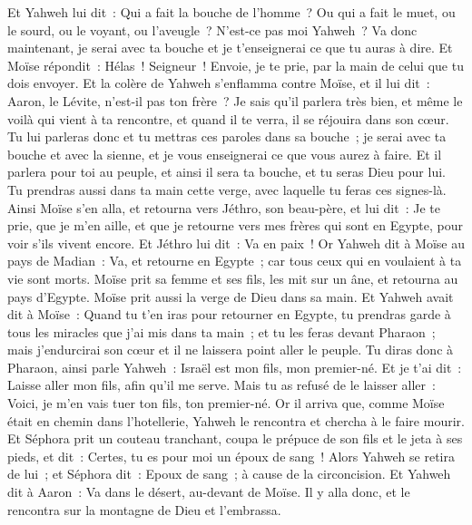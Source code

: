 \begin{multicols}{2}
Et Yahweh lui dit~: Qui a fait la bouche de l'homme~? Ou qui a fait le muet, ou le sourd, ou le voyant, ou l'aveugle~? N'est-ce pas moi Yahweh~?
Va donc maintenant, je serai avec ta bouche et je t'enseignerai ce que tu auras à dire.
Et Moïse répondit~: Hélas~! Seigneur~! Envoie, je te prie, par la main de celui que tu dois envoyer.
Et la colère de Yahweh s'enflamma contre Moïse, et il lui dit~: Aaron, le Lévite, n'est-il pas ton frère~? Je sais qu'il parlera très bien, et même le voilà qui vient à ta rencontre, et quand il te verra, il se réjouira dans son cœur.
Tu lui parleras donc et tu mettras ces paroles dans sa bouche~; je serai avec ta bouche et avec la sienne, et je vous enseignerai ce que vous aurez à faire.
Et il parlera pour toi au peuple, et ainsi il sera ta bouche, et tu seras Dieu pour lui.
Tu prendras aussi dans ta main cette verge, avec laquelle tu feras ces signes-là.
Ainsi Moïse s'en alla, et retourna vers Jéthro, son beau-père, et lui dit~: Je te prie, que je m'en aille, et que je retourne vers mes frères qui sont en Egypte, pour voir s'ils vivent encore. Et Jéthro lui dit~: Va en paix~!
Or Yahweh dit à Moïse au pays de Madian~: Va, et retourne en Egypte~; car tous ceux qui en voulaient à ta vie sont morts.
Moïse prit sa femme et ses fils, les mit sur un âne, et retourna au pays d'Egypte. Moïse prit aussi la verge de Dieu dans sa main.
Et Yahweh avait dit à Moïse~: Quand tu t'en iras pour retourner en Egypte, tu prendras garde à tous les miracles que j'ai mis dans ta main~; et tu les feras devant Pharaon~; mais j'endurcirai son cœur et il ne laissera point aller le peuple.
Tu diras donc à Pharaon, ainsi parle Yahweh~: Israël est mon fils, mon premier-né.
Et je t'ai dit~: Laisse aller mon fils, afin qu'il me serve. Mais tu as refusé de le laisser aller~: Voici, je m'en vais tuer ton fils, ton premier-né.
Or il arriva que, comme Moïse était en chemin dans l'hotellerie, Yahweh le rencontra et chercha à le faire mourir.
Et Séphora prit un couteau tranchant, coupa le prépuce de son fils et le jeta à ses pieds, et dit~: Certes, tu es pour moi un époux de sang~!
Alors Yahweh se retira de lui~; et Séphora dit~: Epoux de sang~; à cause de la circoncision.
Et Yahweh dit à Aaron~: Va dans le désert, au-devant de Moïse. Il y alla donc, et le rencontra sur la montagne de Dieu et l'embrassa.

\end{multicols}
